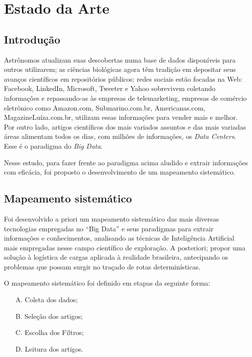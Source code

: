 \chapter{Estado da Arte}\label{arte}

\section{Introdução}\label{arte:intro}

Astrônomos atualizam suas descobertas numa base de dados disponíveis para outros utilizarem; as ciências biológicas agora têm tradição 
em depositar seus avanços científicos em repositórios públicos; redes sociais estão focadas na Web: Facebook, LinkedIn, Microsoft, 
Tweeter e Yahoo sobrevivem coletando informações e repassando-as às empresas de telemarketing, empresas de comércio eletrônico como 
Amazon.com, Submarino.com.br, Americanas.com, MagazineLuíza.com.br, utilizam essas informações para vender mais e melhor. 
Por outro lado, artigos científicos dos mais variados assuntos e das mais variadas áreas alimentam todos os dias, com milhões de 
informações, os \textit{Data Centers}. Esse é o paradigma do \textit{Big Data}.

Nesse estudo, para fazer frente ao paradigma acima aludido e extrair informações com eficácia, 
foi proposto o desenvolvimento de um mapeamento sistemático.

\section*{ Mapeamento sistemático}

Foi desenvolvido a priori um mapeamento sistemático das mais diversas tecnologias empregadas no ``Big Data'' e seus paradigmas para extrair informações e conhecimentos, 
analisando as técnicas de Inteligência Artificial mais empregadas nesse campo científico de exploração.
A posteriori; propor uma solução à logística de cargas aplicada à realidade brasileira, antecipando os problemas que possam surgir no traçado de rotas determinísticas. 

O mapeamento sistemático foi definido em etapas da seguinte forma:

\begin{enumerate}
 \item[A.] Coleta dos dados;
 \item[B.] Seleção dos artigos; 
 \item[C.] Escolha dos Filtros;
 \item[D.] Leitura dos artigos.
\end{enumerate}


